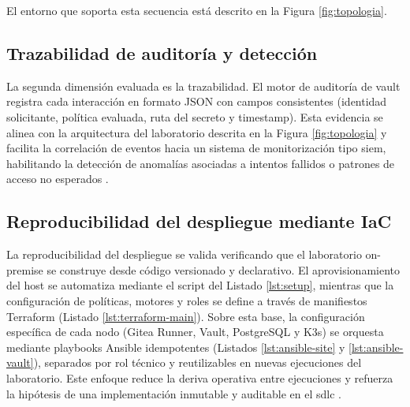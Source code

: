 \documentclass[runningheads]{llncs}
\begin{document}
El entorno que soporta esta secuencia está descrito en la Figura \ref{fig:topologia}.

\subsection{Trazabilidad de auditoría y detección}
La segunda dimensión evaluada es la trazabilidad. El motor de auditoría de \gls{vault} registra cada interacción en formato JSON con campos consistentes (identidad solicitante, política evaluada, ruta del secreto y timestamp). Esta evidencia se alinea con la arquitectura del laboratorio descrita en la Figura \ref{fig:topologia} y facilita la correlación de eventos hacia un sistema de monitorización tipo \gls{siem}, habilitando la detección de anomalías asociadas a intentos fallidos o patrones de acceso no esperados \parencite{vault_audit_devices,nist_sp800_207}.

\subsection{Reproducibilidad del despliegue mediante IaC}
La reproducibilidad del despliegue se valida verificando que el laboratorio on-premise se construye desde código versionado y declarativo. El aprovisionamiento del host se automatiza mediante el script del Listado \ref{lst:setup}, mientras que la configuración de políticas, motores y roles se define a través de manifiestos Terraform (Listado \ref{lst:terraform-main}). Sobre esta base, la configuración específica de cada nodo (Gitea Runner, Vault, PostgreSQL y K3s) se orquesta mediante playbooks Ansible idempotentes (Listados \ref{lst:ansible-site} y \ref{lst:ansible-vault}), separados por rol técnico y reutilizables en nuevas ejecuciones del laboratorio. Este enfoque reduce la deriva operativa entre ejecuciones y refuerza la hipótesis de una implementación inmutable y auditable en el \gls{sdlc} \parencite{terraform_documentation}.
\end{document}
